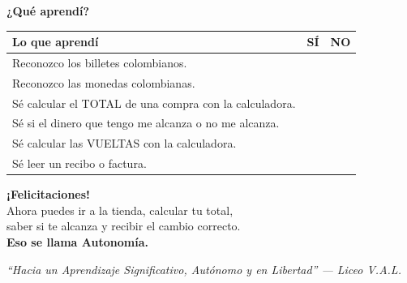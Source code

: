 \documentclass[12pt]{article}
\newcommand{\casilla}{%
  \tcbox[on line, size=minimal,
    colframe=valdark!60, colback=white,
    boxrule=1pt, arc=1mm,
    boxsep=2pt, left=2pt, right=2pt, top=2pt, bottom=2pt]%
  {\makebox[0.6cm]{\vphantom{X}}}}
\begin{document}
\newpage

\begin{tcolorbox}[colback=valblue!10, colframe=valblue,
    arc=4mm, boxrule=2pt]
  \begin{center}
    \Large\bfseries {}\; ¿Qu\'e aprend\'i?
  \end{center}

  \vspace{0.3cm}
  \renewcommand{\arraystretch}{2}
  \begin{tabular}{|m{8.5cm}|c|c|}
    \hline
    \rowcolor{valblue!30}
    \textbf{Lo que aprend\'i} & \textbf{S\'I} & \textbf{NO} \\
    \hline
    Reconozco los billetes colombianos. &
    \casilla & \casilla \\
    \hline
    Reconozco las monedas colombianas. &
    \casilla & \casilla \\
    \hline
    Sé calcular el TOTAL de una compra con la calculadora. &
    \casilla & \casilla \\
    \hline
    Sé si el dinero que tengo me alcanza o no me alcanza. &
    \casilla & \casilla \\
    \hline
    Sé calcular las VUELTAS con la calculadora. &
    \casilla & \casilla \\
    \hline
    Sé leer un recibo o factura. &
    \casilla & \casilla \\
    \hline
  \end{tabular}
\end{tcolorbox}

\vspace{0.5cm}
\begin{center}
  \begin{tcolorbox}[colback=valgreen!15, colframe=valgreen,
      arc=4mm, boxrule=1.5pt, width=0.85\linewidth]
    \centering
    {\Large\bfseries \textcolor{valgreen}{
    ¡Felicitaciones! }}\\[0.3cm]
    \large
    Ahora puedes ir a la tienda, calcular tu total,\\
    saber si te alcanza y recibir el cambio correcto.\\[0.2cm]
    \textbf{Eso se llama Autonom\'ia.}
  \end{tcolorbox}
\end{center}

\vspace{0.4cm}
\begin{center}
  \textit{``Hacia un Aprendizaje Significativo,
  Autónomo y en Libertad'' --- Liceo V.A.L.}
\end{center}
\end{document}
